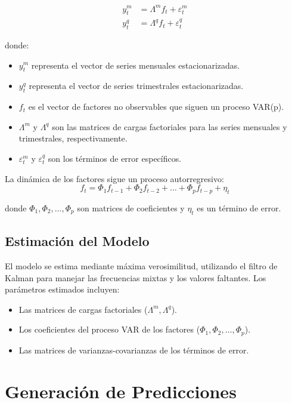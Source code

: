 \documentclass[12pt,a4paper]{article}
\begin{document}
\begin{align}
y_t^m &= \Lambda^m f_t + \varepsilon_t^m \\
y_t^q &= \Lambda^q f_t + \varepsilon_t^q
\end{align}

donde:
\begin{itemize}
    \item $y_t^m$ representa el vector de series mensuales estacionarizadas.
    \item $y_t^q$ representa el vector de series trimestrales estacionarizadas.
    \item $f_t$ es el vector de factores no observables que siguen un proceso VAR(p).
    \item $\Lambda^m$ y $\Lambda^q$ son las matrices de cargas factoriales para las series mensuales y trimestrales, respectivamente.
    \item $\varepsilon_t^m$ y $\varepsilon_t^q$ son los términos de error específicos.
\end{itemize}

La dinámica de los factores sigue un proceso autorregresivo:
\begin{equation}
f_t = \Phi_1 f_{t-1} + \Phi_2 f_{t-2} + \ldots + \Phi_p f_{t-p} + \eta_t
\end{equation}

donde $\Phi_1, \Phi_2, \ldots, \Phi_p$ son matrices de coeficientes y $\eta_t$ es un término de error.

\subsection{Estimación del Modelo}

El modelo se estima mediante máxima verosimilitud, utilizando el filtro de Kalman para manejar las frecuencias mixtas y los valores faltantes. Los parámetros estimados incluyen:
\begin{itemize}
    \item Las matrices de cargas factoriales ($\Lambda^m, \Lambda^q$).
    \item Los coeficientes del proceso VAR de los factores ($\Phi_1, \Phi_2, \ldots, \Phi_p$).
    \item Las matrices de varianzas-covarianzas de los términos de error.
\end{itemize}

\section{Generación de Predicciones}
\end{document}

